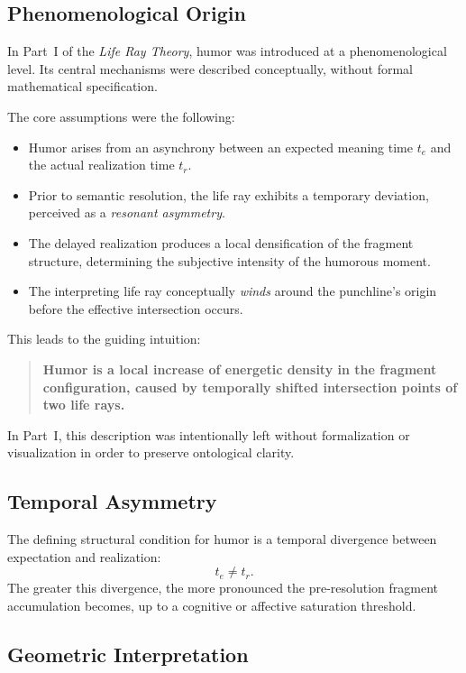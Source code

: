 \documentclass[12pt,a4paper]{article}
\begin{document}
\subsection{Phenomenological Origin}

In Part~I of the \emph{Life Ray Theory}, humor was introduced at a
phenomenological level.
Its central mechanisms were described conceptually, without formal
mathematical specification.

The core assumptions were the following:
\begin{itemize}
    \item Humor arises from an asynchrony between an expected meaning time
          $t_e$ and the actual realization time $t_r$.
    \item Prior to semantic resolution, the life ray exhibits a temporary
          deviation, perceived as a \emph{resonant asymmetry}.
    \item The delayed realization produces a local densification of the
          fragment structure, determining the subjective intensity of
          the humorous moment.
    \item The interpreting life ray conceptually \emph{winds} around the
          punchline’s origin before the effective intersection occurs.
\end{itemize}

This leads to the guiding intuition:

\begin{quote}
\textbf{Humor is a local increase of energetic density in the fragment
configuration, caused by temporally shifted intersection points of
two life rays.}
\end{quote}

In Part~I, this description was intentionally left without
formalization or visualization in order to preserve ontological clarity.

\subsection{Temporal Asymmetry}

The defining structural condition for humor is a temporal divergence
between expectation and realization:
\[
t_e \neq t_r.
\]
The greater this divergence, the more pronounced the pre-resolution
fragment accumulation becomes, up to a cognitive or affective saturation
threshold.

\subsection{Geometric Interpretation}
\end{document}
